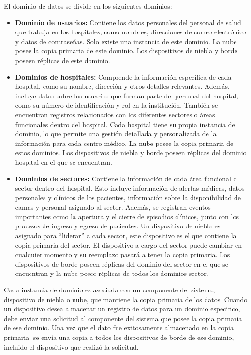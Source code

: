 El dominio de datos se divide en los siguientes dominios:
\begin{itemize}
    \item \textbf{Dominio de usuarios:} Contiene los datos personales del personal de salud que trabaja en los hospitales, como nombres, direcciones de correo electrónico y datos de contraseñas. Solo existe una instancia de este dominio. La nube posee la copia primaria de este dominio. Los dispositivos de niebla y borde poseen réplicas de este dominio.
    \item \textbf{Dominios de hospitales:} Comprende la información específica de cada hospital, como su nombre, dirección y otros detalles relevantes. Además, incluye datos sobre los usuarios que forman parte del personal del hospital, como su número de identificación y rol en la institución. También se encuentran registros relacionados con los diferentes sectores o áreas funcionales dentro del hospital. Cada hospital tiene su propia instancia de dominio, lo que permite una gestión detallada y personalizada de la información para cada centro médico. La nube posee la copia primaria de estos dominios. Los dispositivos de niebla y borde poseen réplicas del dominio hospital en el que se encuentran.
    \item \textbf{Dominios de sectores:} Contiene la información de cada área funcional o sector dentro del hospital. Esto incluye información de alertas médicas, datos personales y clínicos de los pacientes, información sobre la disponibilidad de camas y personal asignado al sector. Además, se registran eventos importantes como la apertura y el cierre de episodios clínicos, junto con los procesos de ingreso y egreso de pacientes. Un dispositivo de niebla es asignado para ``liderar'' a cada sector, este dispositivo es el que contiene la copia primaria del sector. El dispositivo a cargo del sector puede cambiar en cualquier momento y su reemplazo pasará a tener la copia primaria. Los dispositivos de borde poseen réplicas del dominio del sector en el que se encuentran y la nube posee réplicas de todos los dominios sector.
    
\end{itemize}
 Cada instancia de dominio es asociada con un componente del sistema, dispositivo de niebla o nube, que mantiene la copia primaria de los datos. Cuando un dispositivo desea almacenar un registro de datos para un dominio específico, debe enviar una solicitud al componente del sistema que posee la copia primaria de ese dominio. Una vez que el dato fue exitosamente almacenado en la copia primaria, se envía una copia a todos los dispositivos de borde de ese dominio, incluido el dispositivo que realizó la solicitud. 
 
